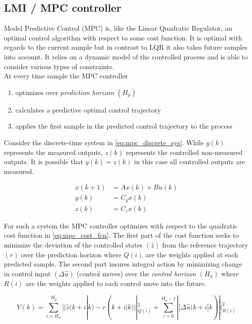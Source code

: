 \subsection{LMI / MPC controller}
Model Predictive Control (MPC) is, like the Linear Quadratic Regulator, an optimal control algorithm with respect to some cost function. It is optimal with regards to the current sample but in contrast to LQR it also takes future samples into account. It relies on a dynamic model of the controlled process and is able to consider various types of constraints.\\

At every time sample the MPC controller
\begin{enumerate}
	\item optimizes over \textit{prediction horizon} $(H_p)$
	\item calculates a predictive optimal control trajectory
	\item applies the first sample in the predicted control trajectory to the process
\end{enumerate}

\medskip

Consider the discrete-time system in \cref{eq:mpc_discrete_sys}. While $y(k)$ represents the measured outputs, $z(k)$ represents the controlled non-measured outputs. It is possible that $y(k) = z(k)$ in this case all controlled outputs are measured.

\begin{equation} \label{eq:mpc_discrete_sys}
	\begin{split}
		x(k+1) 	& = Ax(k) + Bu(k) \\
		y(k) 	& = C_yx(k) \\
		z(k) 	& = C_zx(k)
	\end{split}
\end{equation}

For such a system the MPC controller optimizes with respect to the quadratic cost function in \cref{eq:mpc_cost_fcn}. The first part of the cost function seeks to minimize the deviation of the controlled states $(\hat{z})$ from the reference trajectory $(r)$ over the prediction horizon where $Q(i)$ are the weights applied at each predicted sample. The second part insures integral action by minimizing change in control input $(\Delta \hat{u})$ (control moves) over the \textit{control horizon} $(H_u)$ where $R(i)$ are the weights applied to each control move into the future.

\begin{equation} \label{eq:mpc_cost_fcn}
	V(k) = \sum_{i=H_w}^{H_p}||\hat{z}(k+i|k) - r(k+i|k)||^2_{Q(i)} + \sum_{i=0}^{H_u-1}||\Delta \hat{u}(k+i|k)||^2_{R(i)}
\end{equation}


